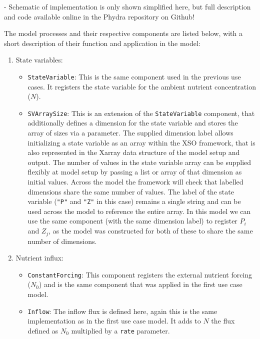 \documentclass[journal abbreviation, manuscript]{copernicus}
\begin{document}
- Schematic of implementation is only shown simplified here, but full description and code available online in the Phydra repository on Github!

The model processes and their respective components are listed below, with a short description of their function and application in the model:

\begin{enumerate}
    \item State variables: 
    \begin{itemize}
        \item \texttt{StateVariable}: This is the same component used in the previous use cases. It registers the state variable for the ambient nutrient concentration ($N$). 
        \item \texttt{SVArraySize}: This is an extension of the \texttt{StateVariable} component, that additionally defines a dimension for the state variable and stores the array of sizes via a parameter. The supplied dimension label allows initializing a state variable as an array within the XSO framework, that is also represented in the Xarray data structure of the model setup and output. The number of values in the state variable array can be supplied flexibly at model setup by passing a list or array of that dimension as initial values. Across the model the framework will check that labelled dimensions share the same number of values. The label of the state variable (\texttt{"P"} and \texttt{"Z"} in this case) remains a single string and can be used across the model to reference the entire array. In this model we can use the same component (with the same dimension label) to register $P_i$ and $Z_j$, as the model was constructed for both of these to share the same number of dimensions.
    \end{itemize}

    \item Nutrient influx: 
    \begin{itemize}
        \item \texttt{ConstantForcing}: This component registers the external nutrient forcing ($N_0$) and is the same component that was applied in the first use case model.
        \item \texttt{Inflow}: The inflow flux is defined here, again this is the same implementation as in the first use case model. It adds to $N$ the flux defined as $N_0$ multiplied by a \texttt{rate} parameter. 
    \end{itemize}
    

\end{enumerate}
\end{document}
